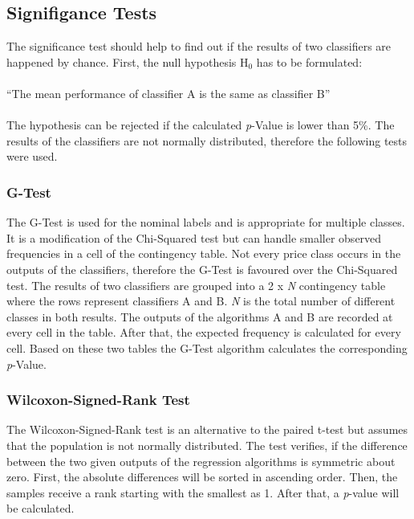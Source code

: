 \subsection{Signifigance Tests}
The significance test should help to find out if the results of two classifiers are happened by chance. First, the null hypothesis H$_{0}$ has to be formulated:\\\\
``The mean performance of classifier A is the same as classifier B''\\\\
The hypothesis can be rejected if the calculated \textit{p}-Value is lower than 5\%. The results of the classifiers are not normally distributed, therefore the following tests were used. 
\subsubsection{G-Test}
The G-Test\cite{gtest} is used for the nominal labels and is appropriate for multiple classes. It is a modification of the Chi-Squared test but can handle smaller observed frequencies in a cell of the contingency table. Not every price class occurs in the outputs of the classifiers, therefore the G-Test is favoured over the Chi-Squared test. The results of two classifiers are grouped into a 2 x \textit{N} contingency table where the rows represent classifiers A and B. \textit{N} is the total number of different classes in both results. The outputs of the algorithms A and B are recorded at every cell in the table. After that, the expected frequency is calculated for every cell. Based on these two tables the G-Test algorithm calculates the corresponding \textit{p}-Value. 
\subsubsection{Wilcoxon-Signed-Rank Test}
The Wilcoxon-Signed-Rank test\cite{wilcoxon} is an alternative to the paired t-test but assumes that the population is not normally distributed. The test verifies, if the difference between the two given outputs of the regression algorithms is symmetric about zero. First, the absolute differences will be sorted in ascending order. Then, the samples receive a rank starting with the smallest as 1. After that, a \textit{p}-value will be calculated.
